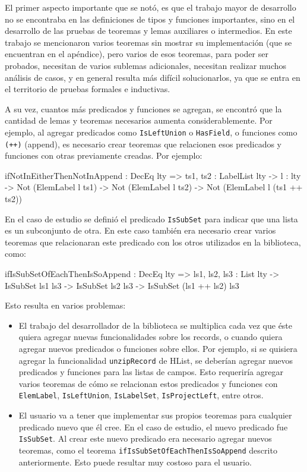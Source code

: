 El primer aspecto importante que se notó, es que el trabajo mayor de desarrollo no se encontraba en las definiciones de tipos y funciones importantes, sino en el desarrollo de las pruebas de teoremas y lemas auxiliares o intermedios. En este trabajo se mencionaron varios teoremas sin mostrar su implementación (que se encuentran en el apéndice), pero varios de esos teoremas, para poder ser probados, necesitan de varios sublemas adicionales, necesitan realizar muchos análisis de casos, y en general resulta más difícil solucionarlos, ya que se entra en el territorio de pruebas formales e inductivas.

A su vez, cuantos más predicados y funciones se agregan, se encontró que la cantidad de lemas y teoremas necesarios aumenta considerablemente. Por ejemplo, al agregar predicados como \texttt{IsLeftUnion} o \texttt{HasField}, o funciones como \texttt{(++)} (append), es necesario crear teoremas que relacionen esos predicados y funciones con otras previamente creadas. Por ejemplo:

\begin{code}
ifNotInEitherThenNotInAppend : DecEq lty =>
  {ts1, ts2 : LabelList lty} -> {l : lty} ->
  Not (ElemLabel l ts1) -> Not (ElemLabel l ts2) ->
  Not (ElemLabel l (ts1 ++ ts2))
\end{code}

En el caso de estudio se definió el predicado \texttt{IsSubSet} para indicar que una lista es un subconjunto de otra. En este caso también era necesario crear varios teoremas que relacionaran este predicado con los otros utilizados en la biblioteca, como:

\begin{code}
ifIsSubSetOfEachThenIsSoAppend : DecEq lty =>
  {ls1, ls2, ls3 : List lty} ->
  IsSubSet ls1 ls3 -> IsSubSet ls2 ls3 ->
  IsSubSet (ls1 ++ ls2) ls3
\end{code}

Esto resulta en varios problemas:

\begin{itemize}
\item El trabajo del desarrollador de la biblioteca se multiplica cada vez que éste quiera agregar nuevas funcionalidades sobre los records, o cuando quiera agregar nuevos predicados o funciones sobre ellos. Por ejemplo, si se quisiera agregar la funcionalidad \texttt{unzipRecord} de HList, se deberían agregar nuevos predicados y funciones para las listas de campos. Esto requeriría agregar varios teoremas de cómo se relacionan estos predicados y funciones con \texttt{ElemLabel}, \texttt{IsLeftUnion}, \texttt{IsLabelSet}, \texttt{IsProjectLeft}, entre otros.
\item El usuario va a tener que implementar sus propios teoremas para cualquier predicado nuevo que él cree. En el caso de estudio, el nuevo predicado fue \texttt{IsSubSet}. Al crear este nuevo predicado era necesario agregar nuevos teoremas, como el teorema \texttt{ifIsSubSetOfEachThenIsSoAppend} descrito anteriormente. Esto puede resultar muy costoso para el usuario.
\end{itemize}

